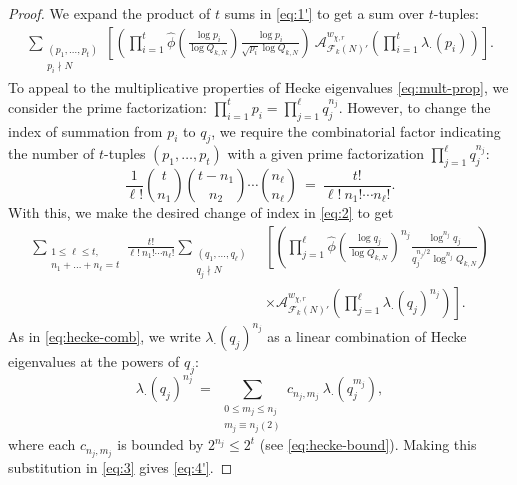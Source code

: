 \documentclass[12pt, reqno,oneside]{amsart}
\theoremstyle{plain}
\theoremstyle{definition}
\theoremstyle{remark}
\theoremstyle{plain}
\numberwithin{equation}{section}
\begin{document}
\begin{proof}
We expand the product of $t$ sums in \eqref{eq:1'} to get a sum over $t$-tuples:
\begin{align}\label{eq:2}
\sum_{\substack{(p_1,\dots,p_t) \\ p_i\nmid N}}\left[\left(\prod_{i=1}^t\widehat{\phi}\left(\frac{\log p_i}{\log Q_{k,N}}\right)\frac{\log p_i}{\sqrt{p_i}\log Q_{k,N}}\right) \ \mathcal{A}^{w_{\chi,r}}_{\mathcal{F}_k(N)'}\left(\prod\nolimits_{i=1}^t \lambda_\cdot(p_i)\right)\right].
\end{align}
To appeal to the multiplicative properties of Hecke eigenvalues \eqref{eq:mult-prop}, we consider the prime factorization: $\prod_{i=1}^t p_i=\prod_{j=1}^\ell q_j^{n_j}$. However, to change the index of summation from $p_i$ to $q_j$, we require the combinatorial factor indicating the number of $t$-tuples $(p_1,\ldots,p_t)$ with a given prime factorization $\prod_{j=1}^\ell q_j^{n_j}$:
\begin{equation}\label{eq:comb-factor}
\frac{1}{\ell!}\binom{t}{n_1}\binom{t-n_1}{n_2}\cdots\binom{n_\ell}{n_\ell} \ = \ \frac{t!}{\ell! \ n_1!\cdots n_\ell!}.
\end{equation}
With this, we make the desired change of index in \eqref{eq:2} to get
\begin{align}\nonumber
\sum_{\substack{1\leq\ell\leq t, \\ n_1+\dots+n_\ell=t}}\frac{t!}{\ell! \ n_1!\cdots n_\ell!}\sum_{\substack{(q_1,\dots,q_\ell)\\ q_j\nmid N}}&\left[\left(\prod_{j=1}^\ell\widehat{\phi}\left(\frac{\log q_j}{\log Q_{k,N}}\right)^{n_j}\frac{\log^{n_j} q_j}{q_j^{n_j/2}\log^{n_j} Q_{k,N}}\right)\right. \\
\label{eq:3}&\left.\times\mathcal{A}^{w_{\chi,r}}_{\mathcal{F}_k(N)'}\left(\prod\nolimits_{j=1}^\ell \lambda_\cdot(q_j)^{n_j}\right)\right].
\end{align}
As in \eqref{eq:hecke-comb}, we write $\lambda_\cdot(q_j)^{n_j}$ as a linear combination of Hecke eigenvalues at the powers of $q_j$:
\begin{equation}
\lambda_\cdot(q_j)^{n_j} \ = \ \sum_{\substack{0\leq m_j\leq n_j\\ m_j\equiv n_j(2)}}c_{n_j,m_j} \ \lambda_\cdot(q_j^{m_j}),
\end{equation} 
where each $c_{n_j,m_j}$ is bounded by $2^{n_j} \leq 2^t$ (see \eqref{eq:hecke-bound}). Making this substitution in \eqref{eq:3} gives \eqref{eq:4'}.
\end{proof}
\end{document}
